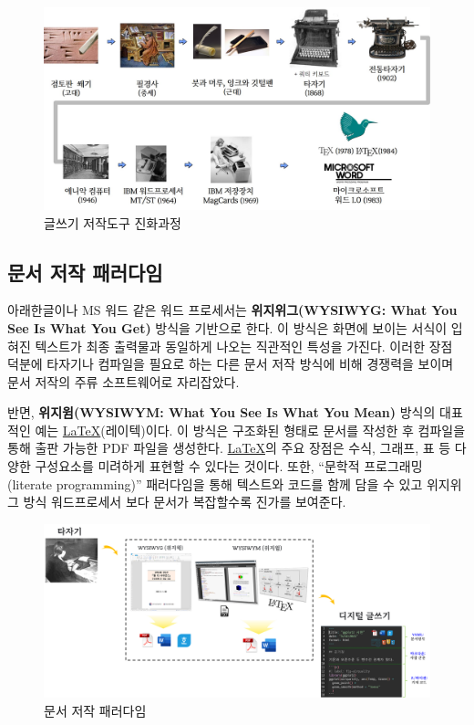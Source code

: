 \documentclass[
  letterpaper,
]{book}
\begin{document}
\begin{figure}

{\centering \includegraphics{images/writing-wordprocessor.jpg}

}

\caption{글쓰기 저작도구 진화과정}

\end{figure}

\hypertarget{uxbb38uxc11c-uxc800uxc791-uxd328uxb7ecuxb2e4uxc784}{%
\subsection{문서 저작
패러다임}\label{uxbb38uxc11c-uxc800uxc791-uxd328uxb7ecuxb2e4uxc784}}

아래한글이나 MS 워드 같은 워드 프로세서는 \textbf{위지위그(WYSIWYG: What
You See Is What You Get)} 방식을 기반으로 한다. 이 방식은 화면에 보이는
서식이 입혀진 텍스트가 최종 출력물과 동일하게 나오는 직관적인 특성을
가진다. 이러한 장점 덕분에 타자기나 컴파일을 필요로 하는 다른 문서 저작
방식에 비해 경쟁력을 보이며 문서 저작의 주류 소프트웨어로 자리잡았다.

반면, \textbf{위지윔(WYSIWYM: What You See Is What You Mean)} 방식의
대표적인 예는 \href{http://example.org}{\LaTeX}(레이텍)이다. 이 방식은
구조화된 형태로 문서를 작성한 후 컴파일을 통해 출판 가능한 PDF 파일을
생성한다. \href{http://example.org}{\LaTeX}의 주요 장점은 수식, 그래프,
표 등 다양한 구성요소를 미려하게 표현할 수 있다는 것이다. 또한, ``문학적
프로그래밍(literate programming)'' 패러다임을 통해 텍스트와 코드를 함께
담을 수 있고 위지위그 방식 워드프로세서 보다 문서가 복잡할수록 진가를
보여준다.

\begin{figure}

{\centering \includegraphics{images/digital-writing-paradigm-shift.png}

}

\caption{문서 저작 패러다임}

\end{figure}
\end{document}
